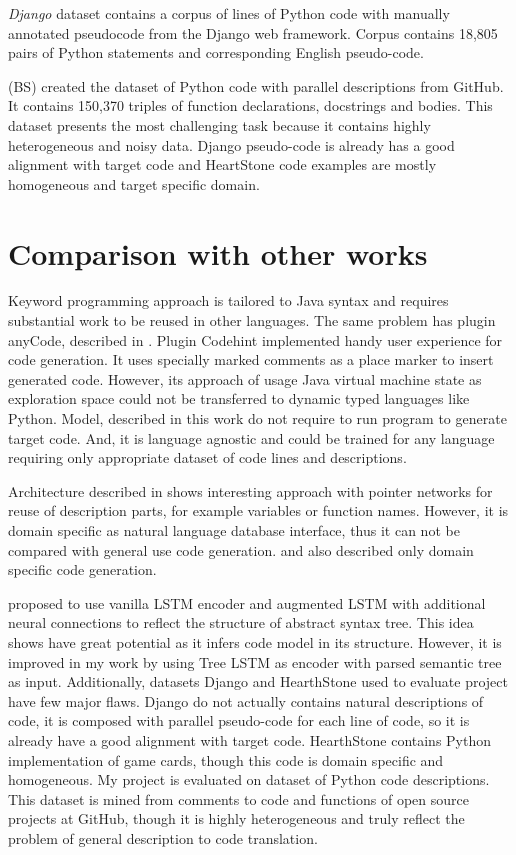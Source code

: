 \emph{Django} dataset \parencite{Oda2015} contains a corpus of lines of Python code with manually annotated pseudocode from the Django web framework. Corpus contains 18,805 pairs of Python statements and corresponding English pseudo-code. 

\cite{Barone2017} (BS) created the dataset of Python code with parallel descriptions from GitHub. It contains 150,370 triples of function declarations, docstrings and bodies. This dataset presents the most challenging task because it contains highly heterogeneous and noisy data. Django pseudo-code is already has a good alignment with target code and HeartStone code examples are mostly homogeneous and target specific domain.

\section{Comparison with other works}

Keyword programming approach \parencite{little2009keyword} is tailored to Java syntax and requires substantial work to be reused in other languages. The same problem has plugin anyCode, described in \cite{Gvero2015}. Plugin Codehint \parencite{Galenson2014} implemented handy user experience for code generation. It uses specially marked comments as a place marker to insert generated code. However, its approach of usage Java virtual machine state as exploration space could not be transferred to dynamic typed languages like Python. Model, described in this work do not require to run program to generate target code. And, it is language agnostic and could be trained for any language requiring only appropriate dataset of code lines and descriptions.

Architecture described in \cite{Zhong2017} shows interesting approach with pointer networks for reuse of description parts, for example variables or function names. However, it is domain specific as natural language database interface, thus it can not be compared with general use code generation. \cite{Chen2016} and \cite{Ling2016} also described only domain specific code generation.

\cite{Yin2017} proposed to use vanilla LSTM encoder and augmented LSTM with additional neural connections to reflect the structure of abstract syntax tree. This idea shows have great potential as it infers code model in its structure. However, it is improved in my work by using Tree LSTM as encoder with parsed semantic tree as input.  Additionally, datasets Django and HearthStone used to evaluate \cite{Yin2017} project have few major flaws. Django do not actually contains natural descriptions of code, it is composed with parallel pseudo-code for each line of code, so it is already have a good alignment with target code. HearthStone contains Python implementation of game cards, though this code is domain specific and homogeneous. My project is evaluated on \cite{Barone2017} dataset of Python code descriptions. This dataset is mined from comments to code and functions of open source projects at GitHub, though it is highly heterogeneous and truly reflect the problem of general description to code translation.